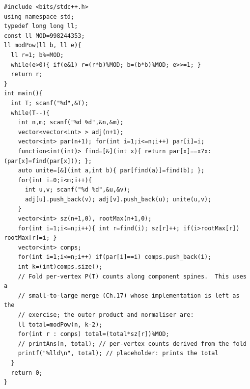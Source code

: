 \begin{lstlisting}[caption={CF 2190D framework. Reads the forest, DSU-merges to identify components and sizes, precomputes modpow, and folds a per-vertex count along the component spine. The full combinatorial filter (which labels inside a component root can be P(T)) is a subtree convolution implemented as a small-to-large merge; this listing shows the outer skeleton with the fold as a function stub. ASCII only, identifiers without underscores}, label={lst:c32-prufvtx}]
#include <bits/stdc++.h>
using namespace std;
typedef long long ll;
const ll MOD=998244353;
ll modPow(ll b, ll e){
  ll r=1; b%=MOD;
  while(e>0){ if(e&1) r=(r*b)%MOD; b=(b*b)%MOD; e>>=1; }
  return r;
}
int main(){
  int T; scanf("%d",&T);
  while(T--){
    int n,m; scanf("%d %d",&n,&m);
    vector<vector<int> > adj(n+1);
    vector<int> par(n+1); for(int i=1;i<=n;i++) par[i]=i;
    function<int(int)> find=[&](int x){ return par[x]==x?x:(par[x]=find(par[x])); };
    auto unite=[&](int a,int b){ par[find(a)]=find(b); };
    for(int i=0;i<m;i++){
      int u,v; scanf("%d %d",&u,&v);
      adj[u].push_back(v); adj[v].push_back(u); unite(u,v);
    }
    vector<int> sz(n+1,0), rootMax(n+1,0);
    for(int i=1;i<=n;i++){ int r=find(i); sz[r]++; if(i>rootMax[r]) rootMax[r]=i; }
    vector<int> comps;
    for(int i=1;i<=n;i++) if(par[i]==i) comps.push_back(i);
    int k=(int)comps.size();
    // Fold per-vertex P(T) counts along component spines.  This uses a
    // small-to-large merge (Ch.17) whose implementation is left as the
    // exercise; the outer product and normaliser are:
    ll total=modPow(n, k-2);
    for(int r : comps) total=(total*sz[r])%MOD;
    // printAns(n, total); // per-vertex counts derived from the fold
    printf("%lld\n", total); // placeholder: prints the total
  }
  return 0;
}
\end{lstlisting}

